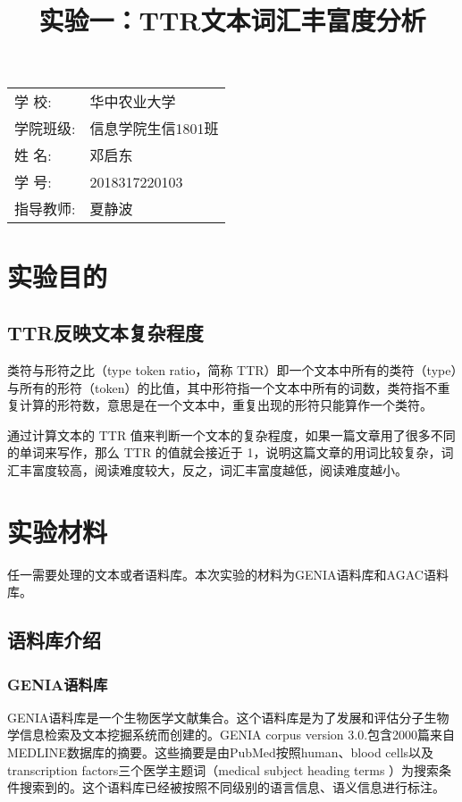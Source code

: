 \documentclass{article}
\title{\heiti 实验一：TTR文本词汇丰富度分析 }
\begin{document}
	\maketitle
	
	\vspace{5cm}
	
	\begin{table}[h]
		\centering
		\begin{Large}
			\begin{tabular}{p{3cm} p{7cm}<{\centering}}
				学  \qquad  校: &  华中农业大学     \\ \cline{2-2}
				学院班级:      & 信息学院生信1801班   \\ \cline{2-2}
				姓  \qquad  名: & 邓启东 \\ \cline{2-2}
				学  \qquad  号: & 2018317220103 \\ \cline{2-2}
				指导教师:       &夏静波 \\ \cline{2-2}
			\end{tabular}
		\end{Large}		
	\end{table}
	
	\newpage%

	\tableofcontents
	
	\newpage
\section{实验目的}
\subsection{TTR反映文本复杂程度}
类符与形符之比（type token ratio，简称 TTR）即一个文本中所有的类符（type）与所有的形符（token）的比值，其中形符指一个文本中所有的词数，类符指不重复计算的形符数，意思是在一个文本中，重复出现的形符只能算作一个类符。

通过计算文本的 TTR 值来判断一个文本的复杂程度，如果一篇文章用了很多不同的单词来写作，那么 TTR 的值就会接近于 1，说明这篇文章的用词比较复杂，词汇丰富度较高，阅读难度较大，反之，词汇丰富度越低，阅读难度越小。
\section{实验材料}
任一需要处理的文本或者语料库。本次实验的材料为GENIA语料库和AGAC语料库。
\subsection{语料库介绍}
	\subsubsection{GENIA语料库}
  GENIA语料库是一个生物医学文献集合。这个语料库是为了发展和评估分子生物学信息检索及文本挖掘系统而创建的。GENIA corpus version 3.0.包含2000篇来自MEDLINE数据库的摘要。这些摘要是由PubMed按照human、blood cells以及transcription factors三个医学主题词（medical subject heading terms ）为搜索条件搜索到的。这个语料库已经被按照不同级别的语言信息、语义信息进行标注。
\end{document}
